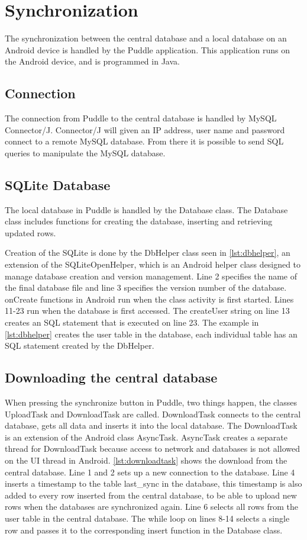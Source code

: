 \section{Synchronization}
The synchronization between the central database and a local database on an Android device is handled by the Puddle application. This application runs on the Android device, and is programmed in Java.

\subsection{Connection}
The connection from Puddle to the central database is handled by MySQL Connector/J. Connector/J will given an IP address, user name and password connect to a remote MySQL database. From there it is possible to send SQL queries to manipulate the MySQL database.

\subsection{SQLite Database}
The local database in Puddle is handled by the Database class. The Database class includes functions for creating the database, inserting and retrieving updated rows.

Creation of the SQLite is done by the DbHelper class seen in \autoref{lst:dbhelper}, an extension of the SQLiteOpenHelper, which is an Android helper class designed to manage database creation and version management. Line 2 specifies the name of the final database file and line 3 specifies the version number of the database.
onCreate functions in Android run when the class activity is first started. Lines 11-23 run when the database is first accessed. The createUser string on line 13 creates an SQL statement that is executed on line 23. The example in \autoref{lst:dbhelper} creates the user table in the database, each individual table has an SQL statement created by the DbHelper.



\subsection{Downloading the central database}
When pressing the synchronize button in Puddle, two things happen, the classes UploadTask and DownloadTask are called. DownloadTask connects to the central database, gets all data and inserts it into the local database. The DownloadTask is an extension of the Android class AsyncTask. AsyncTask creates a separate thread for DownloadTask because access to network and databases is not allowed on the UI thread in Android.
\autoref{lst:downloadtask} shows the download from the central database. Line 1 and 2 sets up a new connection to the database. Line 4 inserts a timestamp to the table last\_sync in the database, this timestamp is also added to every row inserted from the central database, to be able to upload new rows when the databases are synchronized again. Line 6 selects all rows from the user table in the central database. The while loop on lines 8-14 selects a single row and passes it to the corresponding insert function in the Database class.

